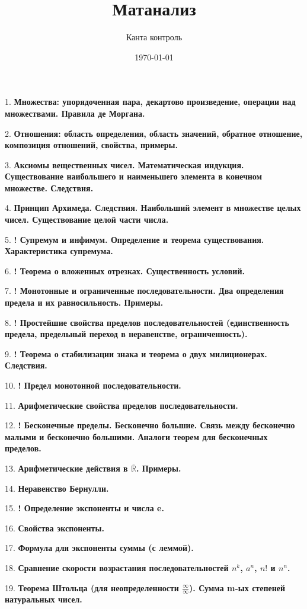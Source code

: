 \documentclass[12pt]{article}
\title{Матанализ}
\author{Канта контроль}
\date{\today}
\begin{document}
\maketitle
\large

1. \textbf{Множества: упорядоченная пара, декартово произведение, операции над множествами. Правила де Моргана.}

2. \textbf{Отношения: область определения, область значений, обратное отношение, композиция отношений, свойства, примеры.}

3. \textbf{Аксиомы вещественных чисел. Математическая индукция. Существование наибольшего и наименьшего элемента в конечном множестве. Следствия.}

4. \textbf{Принцип Архимеда. Следствия. Наибольший элемент в множестве целых чисел. Существование целой части числа.}

5. \textbf{! Супремум и инфимум. Определение и теорема существования. Характеристика супремума.}

6. \textbf{! Теорема о вложенных отрезках. Существенность условий.}

7. \textbf{! Монотонные и ограниченные последовательности. Два определения предела и их равносильность. Примеры.}

8. \textbf{! Простейшие свойства пределов последовательностей (единственность предела, предельный переход в неравенстве, ограниченность).}

9. \textbf{! Теорема о стабилизации знака и теорема о двух милиционерах. Следствия.}

10. \textbf{! Предел монотонной последовательности.}

11. \textbf{Арифметические свойства пределов последовательности.}

12. \textbf{! Бесконечные пределы. Бесконечно большие. Связь между бесконечно малыми и бесконечно большими. Аналоги теорем для бесконечных пределов.}

13. \textbf{Арифметические действия в $\overline{\mathbb{R}}$. Примеры.}

14. \textbf{Неравенство Бернулли.}

15. \textbf{! Определение экспоненты и числа e.}

16. \textbf{Свойства экспоненты.}

17. \textbf{Формула для экспоненты суммы (с леммой).}

18. \textbf{Сравнение скорости возрастания последовательностей $n^k$, $a^n$, $n!$ и $n^n$.}

19. \textbf{Теорема Штольца (для неопределенности $\frac{\infty}{\infty}$). Сумма m-ых степеней натуральных чисел.}
\end{document}
